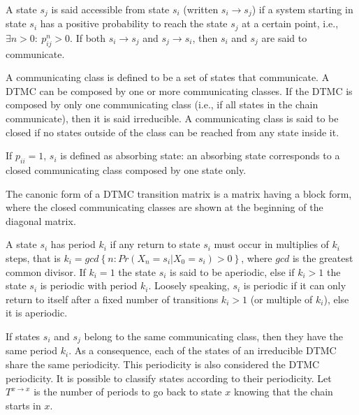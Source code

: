 \documentclass[
  nojss]{jss}
\begin{document}
A state \(s_{j}\) is said accessible from state \(s_{i}\) (written \(s_{i}\rightarrow s_{j}\)) if a system starting in state \(s_{i}\) has a positive probability to reach the state \(s_{j}\) at a certain point, i.e., \(\exists n>0:\: p_{ij}^{n}>0\). If both \(s_{i}\rightarrow s_{j}\) and \(s_{j}\rightarrow s_{i}\), then
\(s_{i}\) and \(s_{j}\) are said to communicate.

A communicating class is defined to be a set of states that communicate. A DTMC can be composed by one or more communicating classes. If the DTMC is composed by only one communicating class (i.e., if all states in the chain communicate), then it is said irreducible. A communicating class is said to be closed if no states outside of the class can be reached from any state inside it.

If \(p_{ii}=1\), \(s_{i}\) is defined as absorbing state: an absorbing state corresponds to a closed communicating class composed by one state only.

The canonic form of a DTMC transition matrix is a matrix having a block form, where the closed communicating classes are shown at the beginning of the diagonal matrix.

A state \(s_{i}\) has period \(k_{i}\) if any return to state \(s_{i}\) must occur in multiplies of \(k_{i}\) steps, that is \(k_{i}=gcd\left\{ n:Pr\left(X_{n}=s_{i}\left|X_{0}=s_{i}\right.\right)>0\right\}\), where \(gcd\) is the greatest common divisor. If \(k_{i}=1\) the state \(s_{i}\) is said to be aperiodic, else if \(k_{i}>1\) the state \(s_{i}\) is periodic with period \(k_{i}\). Loosely speaking, \(s_{i}\) is periodic if it can only return to itself after a fixed number of transitions \(k_{i}>1\) (or multiple of \(k_{i}\)), else it is aperiodic.

If states \(s_{i}\) and \(s_{j}\) belong to the same communicating class, then they have the same period \(k_{i}\). As a consequence, each of the states of an irreducible DTMC share the same periodicity. This periodicity is also considered the DTMC periodicity. It is possible to classify states according to their periodicity. Let \(T^{x\rightarrow x}\) is the number of periods to go back to state \(x\) knowing that the chain starts in \(x\).
\end{document}
